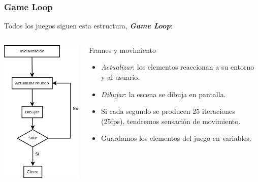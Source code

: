 \begin{frame}
	\frametitle{Game Loop}
	
	\begin{center}
		Todos los juegos siguen esta estructura, \textbf{\emph{Game Loop}}:
	\end{center}	
	
	\begin{columns}
	
	\column{125pt}
	\begin{center}
		\includegraphics[scale=0.25]{img/gameloop.png}
	\end{center}	
	
	\column{175pt}
	\begin{alertblock}{Frames y movimiento}
		\begin{itemize}
			\item \emph{Actualizar}: los elementos reaccionan a su entorno y al usuario.
			\item \emph{Dibujar}: la escena se dibuja en pantalla.
			\item Si cada segundo se producen 25 iteraciones (25fps), tendremos sensación de movimiento.
			\item Guardamos los elementos del juego en variables.
		\end{itemize}            
	\end{alertblock}
	
	\end{columns}
\end{frame}

